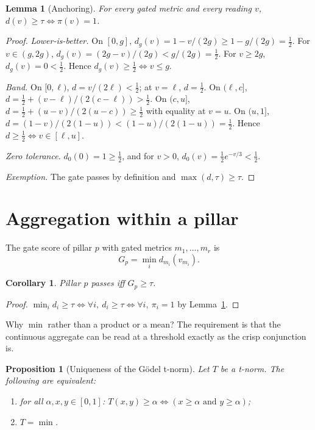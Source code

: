 \documentclass[11pt]{article}
\newtheorem{lemma}{Lemma}
\newtheorem{proposition}{Proposition}
\newtheorem{corollary}{Corollary}
\theoremstyle{remark}
\begin{document}
\begin{lemma}[Anchoring]\label{lem:anchor}
For every gated metric and every reading $v$, $d(v) \ge \tau \iff \pi(v) = 1$.
\end{lemma}

\begin{proof}
\emph{Lower-is-better.} On $[0,g]$, $d_g(v) = 1 - v/(2g) \ge 1 - g/(2g) = \tfrac12$.
For $v \in (g, 2g)$, $d_g(v) = (2g - v)/(2g) < g/(2g) = \tfrac12$. For
$v \ge 2g$, $d_g(v) = 0 < \tfrac12$. Hence $d_g(v) \ge \tfrac12 \iff v \le g$.

\emph{Band.} On $[0,\ell)$, $d = v/(2\ell) < \tfrac12$; at $v = \ell$, $d = \tfrac12$.
On $(\ell, c]$, $d = \tfrac12 + (v-\ell)/(2(c-\ell)) > \tfrac12$. On $(c, u]$,
$d = \tfrac12 + (u - v)/(2(u-c)) \ge \tfrac12$ with equality at $v = u$. On
$(u, 1]$, $d = (1-v)/(2(1-u)) < (1-u)/(2(1-u)) = \tfrac12$. Hence
$d \ge \tfrac12 \iff v \in [\ell, u]$.

\emph{Zero tolerance.} $d_0(0) = 1 \ge \tfrac12$, and for $v > 0$,
$d_0(v) = \tfrac12 e^{-v/3} < \tfrac12$.

\emph{Exemption.} The gate passes by definition and $\max(d, \tau) \ge \tau$.
\end{proof}

\section{Aggregation within a pillar}

The gate score of pillar $p$ with gated metrics $m_1, \dots, m_r$ is
\[
G_p = \min_{i} d_{m_i}(v_{m_i}).
\]

\begin{corollary}\label{cor:gate}
Pillar $p$ passes iff $G_p \ge \tau$.
\end{corollary}

\begin{proof}
$\min_i d_i \ge \tau \iff \forall i,\ d_i \ge \tau \iff \forall i,\ \pi_i = 1$
by Lemma~\ref{lem:anchor}.
\end{proof}

Why $\min$ rather than a product or a mean? The requirement is that the
continuous aggregate can be read at a threshold exactly as the crisp
conjunction is.

\begin{proposition}[Uniqueness of the Gödel t-norm]\label{prop:min}
Let $T$ be a t-norm. The following are equivalent:
\begin{enumerate}
  \item for all $\alpha, x, y \in [0,1]$:
        $T(x,y) \ge \alpha \iff (x \ge \alpha \text{ and } y \ge \alpha)$;
  \item $T = \min$.
\end{enumerate}
\end{proposition}
\end{document}
